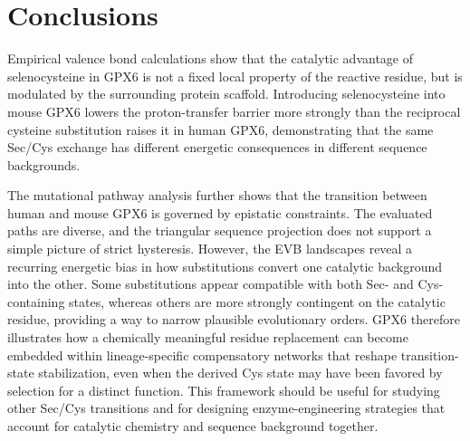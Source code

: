\section{Conclusions}

Empirical valence bond calculations show that the catalytic advantage of selenocysteine in GPX6 is not a fixed local property of the reactive residue, but is modulated by the surrounding protein scaffold. Introducing selenocysteine into mouse GPX6 lowers the proton-transfer barrier more strongly than the reciprocal cysteine substitution raises it in human GPX6, demonstrating that the same Sec/Cys exchange has different energetic consequences in different sequence backgrounds.

The mutational pathway analysis further shows that the transition between human and mouse GPX6 is governed by epistatic constraints. The evaluated paths are diverse, and the triangular sequence projection does not support a simple picture of strict hysteresis. However, the EVB landscapes reveal a recurring energetic bias in how substitutions convert one catalytic background into the other. Some substitutions appear compatible with both Sec- and Cys-containing states, whereas others are more strongly contingent on the catalytic residue, providing a way to narrow plausible evolutionary orders. GPX6 therefore illustrates how a chemically meaningful residue replacement can become embedded within lineage-specific compensatory networks that reshape transition-state stabilization, even when the derived Cys state may have been favored by selection for a distinct function. This framework should be useful for studying other Sec/Cys transitions and for designing enzyme-engineering strategies that account for catalytic chemistry and sequence background together.
